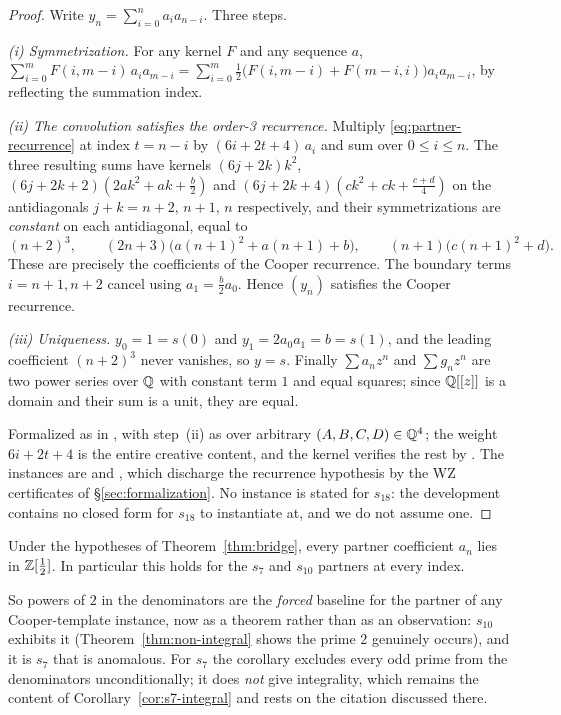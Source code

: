 \begin{proof}
Write $y_n=\sum_{i=0}^n a_ia_{n-i}$. Three steps.

\emph{(i) Symmetrization.} For any kernel $F$ and any sequence $a$,
$\sum_{i=0}^{m}F(i,m-i)\,a_ia_{m-i}
  = \sum_{i=0}^{m}\tfrac12\bigl(F(i,m-i)+F(m-i,i)\bigr)a_ia_{m-i}$,
by reflecting the summation index.

\emph{(ii) The convolution satisfies the order-3 recurrence.} Multiply
\eqref{eq:partner-recurrence} at index $t=n-i$ by $(6i+2t+4)\,a_i$ and sum
over $0\le i\le n$. The three resulting sums have kernels
$(6j+2k)k^2$, \ $(6j+2k+2)(2ak^2+ak+\tfrac b2)$ and
$(6j+2k+4)(ck^2+ck+\tfrac{c+d}4)$ on the antidiagonals $j+k=n+2,\,n+1,\,n$
respectively, and their symmetrizations are \emph{constant} on each
antidiagonal, equal to
\[
  (n+2)^3,\qquad (2n+3)\bigl(a(n+1)^2+a(n+1)+b\bigr),\qquad
  (n+1)\bigl(c(n+1)^2+d\bigr).
\]
These are precisely the coefficients of the Cooper recurrence. The boundary
terms $i=n+1,n+2$ cancel using $a_1=\tfrac b2a_0$. Hence $(y_n)$ satisfies the
Cooper recurrence.

\emph{(iii) Uniqueness.} $y_0=1=s(0)$ and $y_1=2a_0a_1=b=s(1)$, and the leading
coefficient $(n+2)^3$ never vanishes, so $y=s$. Finally $\sum a_nz^n$ and
$\sum g_nz^n$ are two power series over $\mathbb{Q}$ with constant term $1$ and equal
squares; since $\mathbb{Q}[[z]]$ is a domain and their sum is a unit, they are equal.

Formalized as  in
, with step~(ii) as
 over arbitrary
$(A,B,C,D)\in\mathbb{Q}^4$; the weight $6i+2t+4$ is the entire creative content, and
the kernel verifies the rest by . The instances are
 and , which
discharge the recurrence hypothesis by the WZ certificates of
\S\ref{sec:formalization}. No instance is stated for $s_{18}$: the development
contains no closed form for $s_{18}$ to instantiate at, and we do not assume
one.
\end{proof}

\begin{corollary}[status (K)]\label{cor:partner-dyadic}
Under the hypotheses of Theorem~\ref{thm:bridge}, every partner coefficient
$a_n$ lies in $\mathbb{Z}[\tfrac12]$. In particular this holds for the $s_7$ and
$s_{10}$ partners at every index.
\end{corollary}

So powers of $2$ in the denominators are the \emph{forced} baseline for the
partner of any Cooper-template instance, now as a theorem rather than as an
observation: $s_{10}$ exhibits it (Theorem~\ref{thm:non-integral} shows the
prime $2$ genuinely occurs), and it is $s_7$ that is anomalous. For $s_7$ the
corollary excludes every odd prime from the denominators unconditionally; it
does \emph{not} give integrality, which remains the content of
Corollary~\ref{cor:s7-integral} and rests on the citation discussed there.

